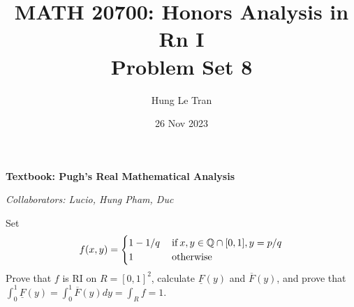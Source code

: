 \documentclass[a4paper, 12pt]{article}
\title{MATH 20700: Honors Analysis in Rn I \\ \large Problem Set 8}
\date{26 Nov 2023}
\author{Hung Le Tran}
\begin{document}
\maketitle
\setcounter{section}{8}
\textbf{Textbook: Pugh's Real Mathematical Analysis}

\textit{Collaborators: Lucio, Hung Pham, Duc}
\begin{problem} 
Set \[
    f(x, y) = \begin{cases}
        1 - 1/q & \:\text{if}\: x, y \in \mathbb{Q} \cap [0, 1], y = p/q \\
        1       & \:\text{otherwise}\:
    \end{cases}
\]
Prove that $f$ is RI on $R = [0, 1]^2$, calculate $\underline{F}(y)$ and $\overline{F}(y)$, and prove that $\int_{0}^{1} \underline{F}(y) = \int_{0}^{1} \overline{F}(y) dy = \int_{R} f = 1$.
\end{problem}
\end{document}
